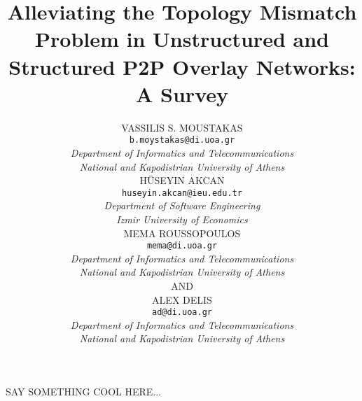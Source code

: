 \documentclass[acmcsur,acmnow]{acmtrans2m}
\title{Alleviating the Topology Mismatch Problem in Unstructured and Structured
P2P Overlay Networks: A Survey}
\author{
VASSILIS S. MOUSTAKAS\\
\texttt{b.moystakas@di.uoa.gr}\\
\emph{Department of Informatics and Telecommunications}\\
\emph{National and Kapodistrian University of Athens}\\
H\"USEYIN AKCAN\\
\texttt{huseyin.akcan@ieu.edu.tr}\\
\emph{Department of Software Engineering}\\
\emph{Izmir University of Economics}\\
MEMA ROUSSOPOULOS\\
\texttt{mema@di.uoa.gr}\\
\emph{Department of Informatics and Telecommunications}\\
\emph{National and Kapodistrian University of Athens}\\
AND\\
ALEX DELIS\\
\texttt{ad@di.uoa.gr}\\
\emph{Department of Informatics and Telecommunications}\\
\emph{National and Kapodistrian University of Athens}
}
\begin{document}
\begin{bottomstuff}
SAY SOMETHING COOL HERE...
\end{bottomstuff}

\maketitle




%
%
%
%
%






%
%
\end{document}
